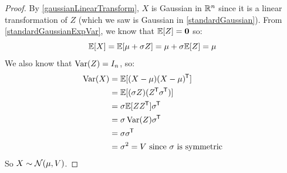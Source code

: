\documentclass[../main.tex]{subfiles}
\begin{document}
\begin{proof}
  By \cref{gaussianLinearTransform}, $X$ is Gaussian in $\mathbb{R}^{n}$ since it is a linear transformation of $Z$ (which we saw is Gaussian in \cref{standardGaussian}).
  From \cref{standardGaussianExpVar}, we know that $\mathbb{E}[Z] = \mathbf{\bm{0}}$ so:
  \[
    \mathbb{E}[X] = \mathbb{E}[\mu + \sigma Z] = \mu + \sigma \mathbb{E}[Z] = \mu
  \]
  We also know that $\operatorname{Var}(Z) = I_n$, so:
  \begin{align*}
    \operatorname{Var}(X) &= \mathbb{E}[(X - \mu)(X - \mu)^{{\mkern-1.5mu\mathsf{T}}}] \\
            &= \mathbb{E}[(\sigma Z)(Z^{{\mkern-1.5mu\mathsf{T}}} \sigma^{{\mkern-1.5mu\mathsf{T}}})] \\
            &= \sigma \mathbb{E}[Z Z^{{\mkern-1.5mu\mathsf{T}}}]\sigma^{{\mkern-1.5mu\mathsf{T}}} \\
            &= \sigma \operatorname{Var}(Z) \sigma^{{\mkern-1.5mu\mathsf{T}}} \\
            &= \sigma \sigma^{{\mkern-1.5mu\mathsf{T}}} \\
            &= \sigma^2 = V \text{ since $\sigma$ is symmetric}
  \end{align*}
  So $X \sim \operatorname{\mathcal{N}}(\mu, V)$.
\end{proof}
\end{document}
